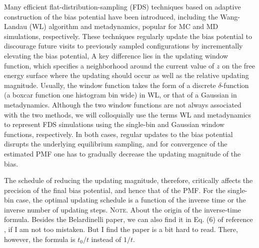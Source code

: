 \documentclass[reprint, superscriptaddress, floatfix]{revtex4-1}
\newcommand{\note}[1]{{\color{DarkGreen}\footnotesize \textsc{Note.} #1}}
\begin{document}
Many efficient flat-distribution-sampling (FDS) techniques
based on adaptive construction of the bias potential
have been introduced,
including the Wang-Landau (WL) algorithm\cite{
  wang2001, *wang2001pre}
and metadynamics\cite{huber1994,
*laio2002, *laio2008, *barducci2011, *sutto2012},
popular for MC and MD simulations, respectively\cite{junghans2014}.
%
%
These techniques regularly update the bias potential
to discourage future visits to previously sampled configurations
by incrementally elevating the bias potential,
%
%
A key difference lies
in the updating window function,
which specifies
a neighborhood around the current value of
$z$ on the free energy surface
where the updating should occur
as well as the relative updating magnitude.
%
Usually, the window function
takes the form of a discrete
$\delta$-function (a boxcar function one histogram bin wide)
in WL,
or that of a Gaussian
in metadynamics.
%
Although the two window functions
are not always associated with
the two methods\cite{micheletti2004, kim2006, *kim2007, junghans2014},
we will colloquially use the terms WL and metadynamics
to represent FDS simulations using the
single-bin and Gaussian window functions, respectively.
%
%
In both cases,
regular updates to the bias potential
disrupts the underlying equilibrium
sampling\cite{zhou2005, morozov2007, zhou2008},
and for convergence of the estimated PMF
one  has to gradually decrease
the updating magnitude of the bias.



The schedule of reducing
the updating magnitude,
therefore, critically affects
the precision of the final bias potential,
and hence that of the PMF\cite{laio2005, bussi2006, poulain2006,
belardinelli2007, *belardinelli2007jcp, *belardinelli2008, *belardinelli2016,
liang2007, min2007,
morozov2007, zhou2008,
komura2012, *caparica2012, *caparica2014,
barducci2008, dickson2011, dama2014}.
%
For the single-bin case, the optimal updating schedule
is a function of the
inverse time\cite{
belardinelli2007, *belardinelli2007jcp, *belardinelli2008, *belardinelli2016,
liang2007,
morozov2007, zhou2008}
or
the inverse number of updating steps.
\note{
  About the origin of the inverse-time formula.
  Besides the Belardinelli paper,
  we can also find it in Eq. (6) of reference \cite{liang2007},
  if I am not too mistaken.
  But I find the paper is a bit hard to read.
  There, however, the formula is $t_0/t$ instead of $1/t$.
}
%
\end{document}
